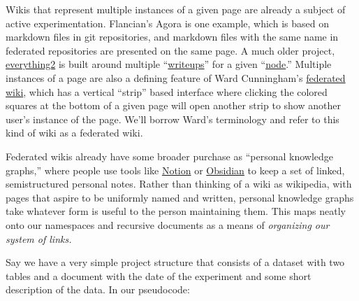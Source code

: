 Wikis that represent multiple instances of a given page are already a
subject of active experimentation. Flancian's Agora is one example,
which is based on markdown files in git repositories, and markdown files
with the same name in federated repositories are presented on the same
page. A much older project, \href{https://everything2.com/}{everything2} is
built around multiple
``\href{https://everything2.com/title/Writeup}{writeups}'' for a given
``\href{https://everything2.com/title/Node}{node}.'' Multiple instances
of a page are also a defining feature of Ward Cunningham's
\href{http://ward.fed.wiki.org/view/welcome-visitors/view/home-in-the-federation}{federated
wiki}, which has a vertical ``strip'' based interface where clicking the
colored squares at the bottom of a given page will open another strip to
show another user's instance of the page. We'll borrow Ward's
terminology and refer to this kind of wiki as a federated wiki.

Federated wikis already have some broader purchase as ``personal
knowledge graphs,'' \citep{balogPersonalKnowledgeGraphs2019} 
where people use tools like \href{https://www.notion.so/}{Notion} or
\href{https://obsidian.md/}{Obsidian} to keep a set of linked,
semistructured personal notes. Rather than thinking of a wiki as
wikipedia, with pages that aspire to be uniformly named and written,
personal knowledge graphs take whatever form is useful to the person
maintaining them. This maps neatly onto our namespaces and recursive
documents as a means of \emph{organizing our system of links.}

Say we have a very simple project structure that consists of a dataset
with two tables and a document with the date of the experiment and some
short description of the data. In our pseudocode:

\begin{Shaded}
\begin{Highlighting}[]



\end{Highlighting}
\end{Shaded}

